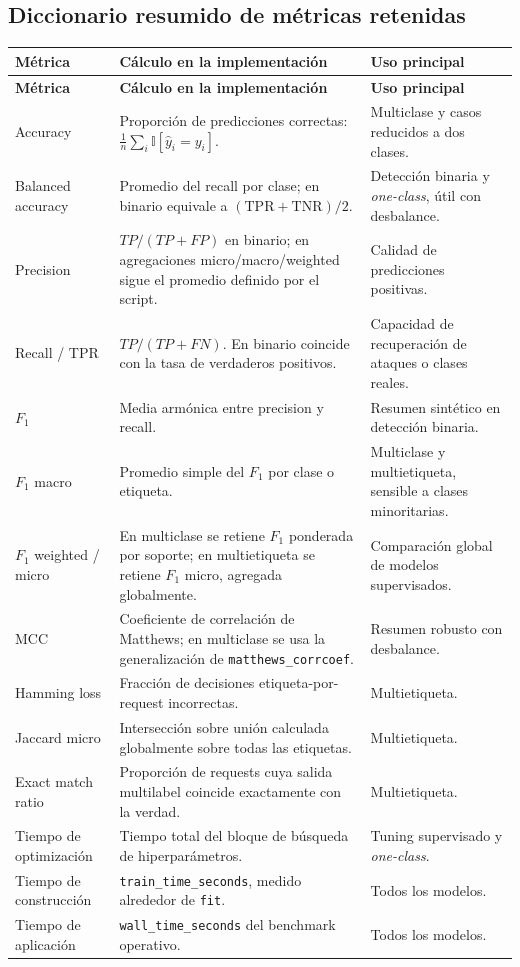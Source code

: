 \documentclass[12pt,oneside]{report}
\newcommand{\ind}{\mathbb{I}} %
\begin{document}
\subsection{Diccionario resumido de métricas retenidas}
\footnotesize
\begin{longtable}{@{}>{\RaggedRight\arraybackslash}p{3.2cm}>{\RaggedRight\arraybackslash}p{6.2cm}>{\RaggedRight\arraybackslash}p{4.1cm}@{}}
\toprule
\textbf{Métrica} & \textbf{Cálculo en la implementación} & \textbf{Uso principal} \\
\midrule
\endfirsthead
\toprule
\textbf{Métrica} & \textbf{Cálculo en la implementación} & \textbf{Uso principal} \\
\midrule
\endhead
Accuracy & Proporción de predicciones correctas: $\frac{1}{n}\sum_i \ind[\hat y_i=y_i]$. & Multiclase y casos reducidos a dos clases. \\
Balanced accuracy & Promedio del recall por clase; en binario equivale a $(\mathrm{TPR}+\mathrm{TNR})/2$. & Detección binaria y \textit{one-class}, útil con desbalance. \\
Precision & $TP/(TP+FP)$ en binario; en agregaciones micro/macro/weighted sigue el promedio definido por el script. & Calidad de predicciones positivas. \\
Recall / TPR & $TP/(TP+FN)$. En binario coincide con la tasa de verdaderos positivos. & Capacidad de recuperación de ataques o clases reales. \\
$F_1$ & Media armónica entre precision y recall. & Resumen sintético en detección binaria. \\
$F_1$ macro & Promedio simple del $F_1$ por clase o etiqueta. & Multiclase y multietiqueta, sensible a clases minoritarias. \\
$F_1$ weighted / micro & En multiclase se retiene $F_1$ ponderada por soporte; en multietiqueta se retiene $F_1$ micro, agregada globalmente. & Comparación global de modelos supervisados. \\
MCC & Coeficiente de correlación de Matthews; en multiclase se usa la generalización de \texttt{matthews\_corrcoef}. & Resumen robusto con desbalance. \\
Hamming loss & Fracción de decisiones etiqueta-por-request incorrectas. & Multietiqueta. \\
Jaccard micro & Intersección sobre unión calculada globalmente sobre todas las etiquetas. & Multietiqueta. \\
Exact match ratio & Proporción de requests cuya salida multilabel coincide exactamente con la verdad. & Multietiqueta. \\
Tiempo de optimización & Tiempo total del bloque de búsqueda de hiperparámetros. & Tuning supervisado y \textit{one-class}. \\
Tiempo de construcción & \texttt{train\_time\_seconds}, medido alrededor de \texttt{fit}. & Todos los modelos. \\
Tiempo de aplicación & \texttt{wall\_time\_seconds} del benchmark operativo. & Todos los modelos. \\
\bottomrule
\end{longtable}
\normalsize
\end{document}
